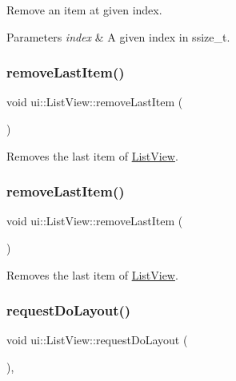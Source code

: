 Remove an item at given index.


\begin{DoxyParams}{Parameters}
{\em index} & A given index in ssize\+\_\+t. \\
\hline
\end{DoxyParams}
\mbox{\label{classui_1_1ListView_ac1f87fcfe590bd09123528ef19885cdb}} 
\subsubsection{\texorpdfstring{remove\+Last\+Item()}{removeLastItem()}\hspace{0.1cm}{\footnotesize\ttfamily [1/2]}}
{\footnotesize\ttfamily void ui\+::\+List\+View\+::remove\+Last\+Item (\begin{DoxyParamCaption}{ }\end{DoxyParamCaption})}

Removes the last item of \hyperlink{classui_1_1ListView}{List\+View}. \mbox{\label{classui_1_1ListView_ac1f87fcfe590bd09123528ef19885cdb}} 
\subsubsection{\texorpdfstring{remove\+Last\+Item()}{removeLastItem()}\hspace{0.1cm}{\footnotesize\ttfamily [2/2]}}
{\footnotesize\ttfamily void ui\+::\+List\+View\+::remove\+Last\+Item (\begin{DoxyParamCaption}{ }\end{DoxyParamCaption})}

Removes the last item of \hyperlink{classui_1_1ListView}{List\+View}. \mbox{\label{classui_1_1ListView_ad02cdf77d0d8f0dd2586b2bc083d4750}} 
\subsubsection{\texorpdfstring{request\+Do\+Layout()}{requestDoLayout()}\hspace{0.1cm}{\footnotesize\ttfamily [1/2]}}
{\footnotesize\ttfamily void ui\+::\+List\+View\+::request\+Do\+Layout (\begin{DoxyParamCaption}{ }\end{DoxyParamCaption})\hspace{0.3cm}{\ttfamily [override]}, {\ttfamily [virtual]}}

